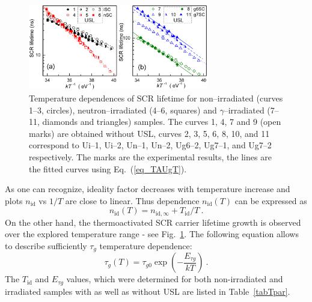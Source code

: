 \documentclass[aip,jap, amsmath,amssymb,reprint]{revtex4-1}
\begin{document}
\begin{figure}
\includegraphics[width=0.7\textwidth]{olikhFig3}%
\caption{\label{fig_TAUg}
Temperature dependences of SCR lifetime for non--irradiated (curves 1--3, circles),
neutron--irradiated (4--6, squares) and $\gamma$--irradiated (7--11, diamonds and triangles) samples.
The curves 1, 4, 7 and 9 (open marks) are obtained without USL,
curves 2, 3, 5, 6, 8, 10, and 11 correspond to
Ui--1, Ui--2, Un--1, Un--2, Ug6--2, Ug7--1, and Ug7--2 respectively.
The marks are the experimental results, the lines are the fitted curves using Eq.~(\ref{eq_TAUgT}).
}%
\end{figure}

As one can recognize, ideality factor decreases with temperature increase and plots $n_{\mathrm{id}}$ vs $1/T$  are close to linear.
Thus dependence $n_{\mathrm{id}}(T)$ can be expressed as
\begin{equation}
\label{eq_nT}
    n_{\mathrm{id}}(T)=n_{\mathrm{id},\infty}+T_{\mathrm{id}}/T\:.
\end{equation}
On the other hand, the thermoactivated SCR carrier lifetime growth  is observed over the explored temperature range - see Fig.~\ref{fig_TAUg}.
The following equation allows to describe sufficiently $\tau_{g}$ temperature dependence:
\begin{equation}
\label{eq_TAUgT}
    \tau_{g}(T)=\tau_{g0}\exp\left(-\frac{E_{\tau g}}{kT}\right)\:.
\end{equation}
The $T_{\mathrm{id}}$ and $E_{\tau g}$ values, which were determined for both non-irradiated and irradiated samples with as well as without USL are listed in Table~\ref{tabTpar}.
\end{document}
